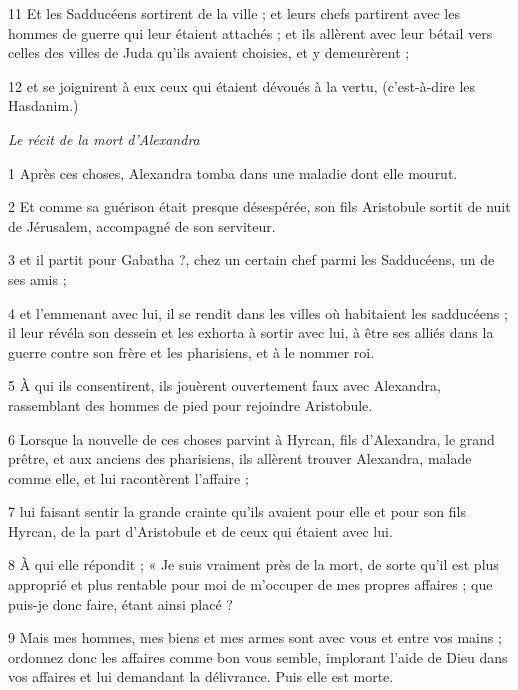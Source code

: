 \par 11 Et les Sadducéens sortirent de la ville ; et leurs chefs partirent avec les hommes de guerre qui leur étaient attachés ; et ils allèrent avec leur bétail vers celles des villes de Juda qu'ils avaient choisies, et y demeurèrent ;

\par 12 et se joignirent à eux ceux qui étaient dévoués à la vertu, (c'est-à-dire les Hasdanim.)


\par \textit{Le récit de la mort d'Alexandra}

\par 1 Après ces choses, Alexandra tomba dans une maladie dont elle mourut.

\par 2 Et comme sa guérison était presque désespérée, son fils Aristobule sortit de nuit de Jérusalem, accompagné de son serviteur.

\par 3 et il partit pour Gabatha ?, chez un certain chef parmi les Sadducéens, un de ses amis ;

\par 4 et l'emmenant avec lui, il se rendit dans les villes où habitaient les sadducéens ; il leur révéla son dessein et les exhorta à sortir avec lui, à être ses alliés dans la guerre contre son frère et les pharisiens, et à le nommer roi.

\par 5 À qui ils consentirent, ils jouèrent ouvertement faux avec Alexandra, rassemblant des hommes de pied pour rejoindre Aristobule.

\par 6 Lorsque la nouvelle de ces choses parvint à Hyrcan, fils d'Alexandra, le grand prêtre, et aux anciens des pharisiens, ils allèrent trouver Alexandra, malade comme elle, et lui racontèrent l'affaire ;

\par 7 lui faisant sentir la grande crainte qu'ils avaient pour elle et pour son fils Hyrcan, de la part d'Aristobule et de ceux qui étaient avec lui.

\par 8 À qui elle répondit ; « Je suis vraiment près de la mort, de sorte qu'il est plus approprié et plus rentable pour moi de m'occuper de mes propres affaires ; que puis-je donc faire, étant ainsi placé ?

\par 9 Mais mes hommes, mes biens et mes armes sont avec vous et entre vos mains ; ordonnez donc les affaires comme bon vous semble, implorant l'aide de Dieu dans vos affaires et lui demandant la délivrance. Puis elle est morte.

